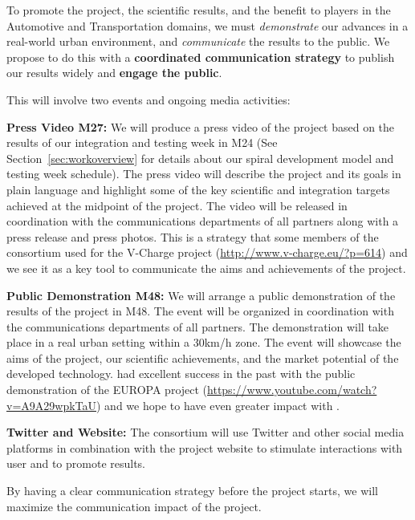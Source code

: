 To promote the \Project{} project, the scientific results, and the benefit to players in the Automotive and Transportation domains, we must {\em demonstrate} our advances in a real-world urban environment, and {\em communicate} the results to the public. We propose to do this with a {\bf coordinated communication strategy} to publish our results widely and {\bf engage the public}.

This will involve two events and ongoing media activities:
\begin{denseItemize}
  \item {\bf Press Video M27:} We will produce a press video of the project based on the results of our integration and testing week in M24 (See Section~\ref{sec:workoverview} for details about our spiral development model and testing week schedule). The press video will describe the project and its goals in plain language and highlight some of the key scientific and integration targets achieved at the midpoint of the project. The video will be released in coordination with the communications departments of all partners along with a press release and press photos. This is a strategy that some members of the consortium used for the V-Charge project ({\footnotesize \url{http://www.v-charge.eu/?p=614}}) and we see it as a key tool to communicate the aims and achievements of the project.
  \item {\bf Public Demonstration M48:} We will arrange a public demonstration of the results of the project in M48. The event will be organized in coordination with the communications departments of all partners. The demonstration will take place in a real urban setting within a 30km/h zone. The event will showcase the aims of the project, our scientific achievements, and the market potential of the developed technology. \ETHZ{} had excellent success in the past with the public demonstration of the EUROPA project ({\footnotesize \url{https://www.youtube.com/watch?v=A9A29wpkTaU}}) and we hope to have even greater impact with \Project{}.
\item {\bf Twitter and Website:} The consortium will use Twitter and other social media platforms in combination with the project website to stimulate interactions with user and to promote results. 
\end{denseItemize}
By having a clear communication strategy before the project starts, we will maximize the communication impact of the \Project{} project.


